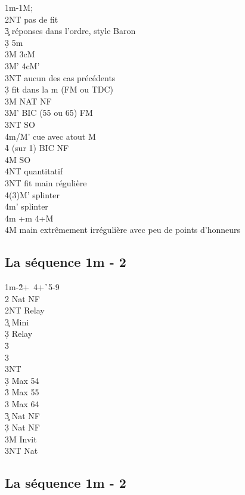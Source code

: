 \documentclass[a4paper]{article}
\begin{document}
\begin{bidtable}
1m-1M;\\
2NT \> pas de fit\+\\
3\c \> réponses dans l'ordre, style Baron\+\\
3\d \> 5m\\
3M \> 3cM\\
3M' \> 4cM'\\
3NT \> aucun des cas précédents\-\\
3\d \> fit dans la m (FM ou TDC)\\
3M \> NAT NF\\
3M' \> BIC (55 ou 65) FM\\
3NT \> SO\\
4m/M' \> cue avec atout M\\
4\h \> (sur 1\s ) BIC NF\\
4M \> SO\\
4NT \> quantitatif\-\\
3NT \> fit main régulière\\
4(3)M’ \> splinter\\
4m’ \> splinter\\
4m +m 4+M\\
4M \> main extrêmement irrégulière avec peu de points d’honneurs
\end{bidtable}

\subsection{La séquence 1m - 2\pdfh}

\begin{bidtable}
1m-2\h {}+\s\ 4+\h\ 5-9\+\\
2\s \> Nat NF\\
2NT \> Relay\+\\
3\c \> Mini\+\\
3\d \> Relay\+\\
3\h {}\\
3\s {}\\
3NT \-\-\\
3\d \> Max 54\\
3\h \> Max 55\\
3\s \> Max 64\-\\
3\c \> Nat NF\\
3\d \> Nat NF\\
3M \> Invit\\
3NT \> Nat\-
\end{bidtable}

\subsection{La séquence 1m - 2\pdfs}
\end{document}
